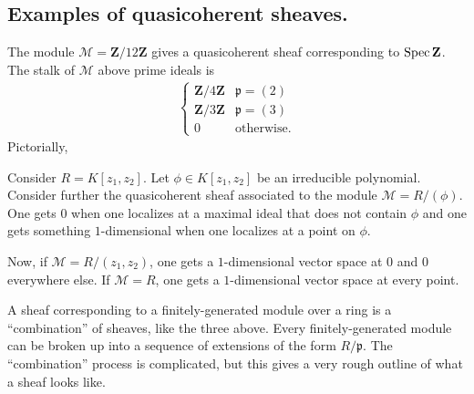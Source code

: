 \documentclass [11 pt, oneside] {article}
\begin{document}
\subsection{Examples of quasicoherent sheaves.}
\begin{example}[ ]\label{}\text{}
The module $\mathscr{M} = \mathbf{Z}/12\mathbf{Z}$ gives a quasicoherent sheaf corresponding to $\operatorname{Spec} \mathbf{Z}$. The stalk of $\mathscr{M}$ above prime ideals is
\begin{align*}
	\begin{cases}
		\mathbf{Z}/4\mathbf{Z}&\mathfrak{p}=(2)\\
		\mathbf{Z}/3\mathbf{Z}& \mathfrak{p}=(3)\\
		0 &\textrm{otherwise.}
	\end{cases}
\end{align*}
Pictorially,
\begin{center}
\end{center}
\end{example}

\begin{example}[ ]\label{}\text{}
Consider $R= K[z_1,z_2]$. Let $\phi\in K[z_1,z_2]$ be an irreducible polynomial. Consider further the quasicoherent sheaf associated to the module $\mathscr{M}= R/(\phi)$. One gets $0$ when one localizes at a maximal ideal that does not contain $\phi$ and one gets something $1$-dimensional when one localizes at a point on $\phi$.

Now, if $\mathscr{M}=R/(z_1,z_2)$, one gets a $1$-dimensional vector space at $0$ and $0$ everywhere else. If $\mathscr{M}=R$, one gets a $1$-dimensional vector space at every point.
\end{example}

\begin{remark}
	A sheaf corresponding to a finitely-generated module over a ring is a ``combination'' of sheaves, like the three above. Every finitely-generated module can be broken up into a sequence of extensions of the form $R/\mathfrak{p}$. The ``combination'' process is complicated, but this gives a very rough outline of what a sheaf looks like.
\end{remark}
\end{document}
